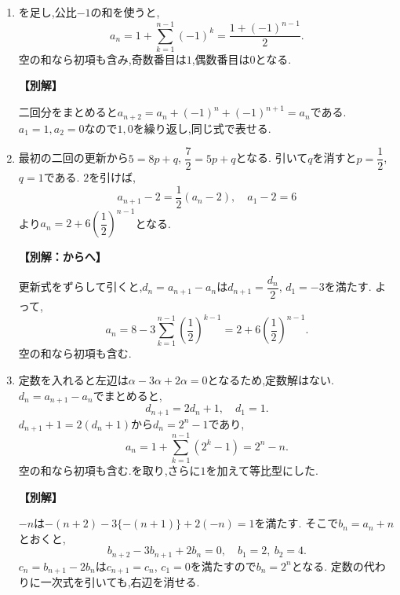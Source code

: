 \begin{enumerate}[label=\textbf{問\arabic*.},leftmargin=3.8em,format=\bookitemlink{practice-basic}{solution}{problem}]
          \item {}を足し,公比$-1$の和を使うと,
                  \[
                    a_n=1+\sum_{k=1}^{n-1}(-1)^k
                       =\frac{1+(-1)^{n-1}}2.
                  \]
                  空の和なら初項も含み,奇数番目は$1$,偶数番目は$0$となる.
                  \par\smallskip\noindent\textbf{【別解】}\par
                  二回分をまとめると$a_{n+2}=a_n+(-1)^n+(-1)^{n+1}=a_n$である.
                  $a_1=1,a_2=0$なので$1,0$を繰り返し,同じ式で表せる.

          \item 最初の二回の更新から$5=8p+q$, $\dfrac{7}{2}=5p+q$となる.
                  引いて$q$を消すと$p=\dfrac{1}{2}$, $q=1$である.
                  $2$を引けば,
                  \[
                    a_{n+1}-2=\frac12(a_n-2),\quad a_1-2=6
                  \]
                  より$a_n=2+6\left(\dfrac{1}{2}\right)^{n-1}$となる.
                  \par\smallskip\noindent\textbf{【別解：からへ】}\par
                  更新式をずらして引くと,$d_n=a_{n+1}-a_n$は$d_{n+1}=\dfrac{d_n}{2}$, $d_1=-3$を満たす.
                  よって,
                  \[
                    a_n=8-3\sum_{k=1}^{n-1}\left(\frac12\right)^{k-1}
                       =2+6\left(\frac12\right)^{n-1}.
                  \]
                  空の和なら初項も含む.

          \item 定数を入れると左辺は$\alpha-3\alpha+2\alpha=0$となるため,定数解はない.
                  $d_n=a_{n+1}-a_n$でまとめると,
                  \[
                    d_{n+1}=2d_n+1,\quad d_1=1.
                  \]
                  $d_{n+1}+1=2(d_n+1)$から$d_n=2^n-1$であり,
                  \[
                    a_n=1+\sum_{k=1}^{n-1}(2^k-1)=2^n-n.
                  \]
                  空の和なら初項も含む.を取り,さらに$1$を加えて等比型にした.
                  \par\smallskip\noindent\textbf{【別解】}\par
                  $-n$は$-(n+2)-3\{-(n+1)\}+2(-n)=1$を満たす.
                  そこで$b_n=a_n+n$とおくと,
                  \[
                    b_{n+2}-3b_{n+1}+2b_n=0,\quad b_1=2,\ b_2=4.
                  \]
                  $c_n=b_{n+1}-2b_n$は$c_{n+1}=c_n$, $c_1=0$を満たすので$b_n=2^n$となる.
                  定数の代わりに一次式を引いても,右辺を消せる.


\end{enumerate}
